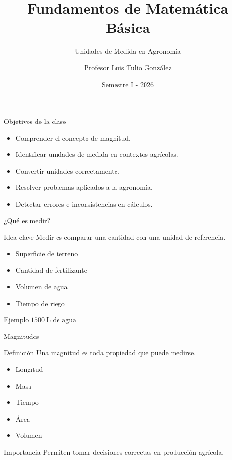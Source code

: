 \documentclass[aspectratio=169,10pt]{beamer}
\title{Fundamentos de Matemática Básica}
\subtitle{Unidades de Medida en Agronomía}
\author{Profesor Luis Tulio González}
\institute{Universidad Santo Tomás \\ Departamento de Ciencias Básicas}
\date{Semestre I - 2026}
\begin{document}
	
	\begin{frame}
		\titlepage
	\end{frame}
	
	\begin{frame}{Objetivos de la clase}
		\begin{itemize}[<+->]
			\item Comprender el concepto de magnitud.
			\item Identificar unidades de medida en contextos agrícolas.
			\item Convertir unidades correctamente.
			\item Resolver problemas aplicados a la agronomía.
			\item Detectar errores e inconsistencias en cálculos.
		\end{itemize}
	\end{frame}
	
	\begin{frame}{¿Qué es medir?}
		\begin{block}{Idea clave}
			Medir es comparar una cantidad con una unidad de referencia.
		\end{block}
		
		\begin{itemize}[<+->]
			\item Superficie de terreno
			\item Cantidad de fertilizante
			\item Volumen de agua
			\item Tiempo de riego
		\end{itemize}
		
		\pause
		\begin{exampleblock}{Ejemplo}
			\(1500\ \text{L de agua}\)
		\end{exampleblock}
	\end{frame}
	
	\begin{frame}{Magnitudes}
		\begin{block}{Definición}
			Una magnitud es toda propiedad que puede medirse.
		\end{block}
		
		\begin{itemize}[<+->]
			\item Longitud
			\item Masa
			\item Tiempo
			\item Área
			\item Volumen
		\end{itemize}
		
		\pause
		\begin{alertblock}{Importancia}
			Permiten tomar decisiones correctas en producción agrícola.
		\end{alertblock}
	\end{frame}
	
\end{document}
